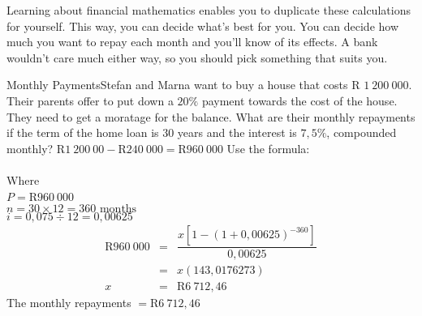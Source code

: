 Learning about financial mathematics enables you to duplicate these calculations for yourself. This way, you can decide what's best for you. You can decide how much you want to repay each month and you'll know of its effects. A bank wouldn't care much either way, so you should pick something that suits you.

\begin{wex}{Monthly Payments}{Stefan and Marna want to buy a house that costs R $1~200~000$. Their parents offer to put down a $20\%$ payment towards the cost of the house.  They need to get a moratage for the balance.  What are their monthly repayments if the term of the home loan is 30 years and the interest is $7,5\%$, compounded monthly?}
{
R$ 1~200~00 - $R$ 240~000 = $R$ 960~000$
Use the formula: \\
\\
Where \\
$P = $R$960~000$\\
$n = 30 \times 12 = 360 \mbox{ months}$\\
$i = 0,075 \div 12 = 0,00625$
\begin{eqnarray*}
\mbox{R}960~000&=& \dfrac{x[1-(1 + 0,00625)^{-360}]}{0,00625}\\
&=&x(143,0176273)\\
x&=&\mbox{R} 6~712,46
\end{eqnarray*}
The monthly repayments $= $R$6~712,46$
}
\end{wex}


